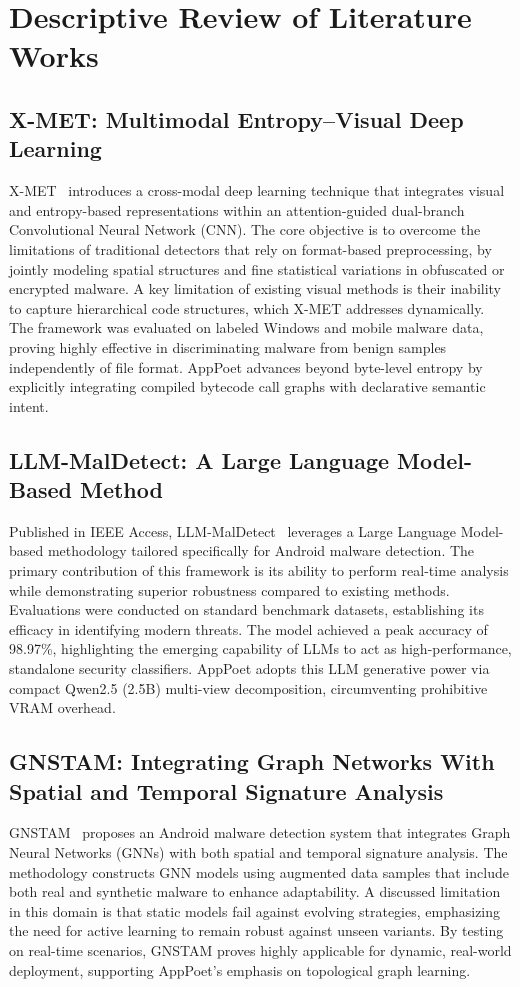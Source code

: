 \documentclass[12pt,a4paper,oneside]{report}
\begin{document}
\section{Descriptive Review of Literature Works}

\subsection{X-MET: Multimodal Entropy--Visual Deep Learning}
X-MET~\cite{ref16} introduces a cross-modal deep learning technique that integrates visual and entropy-based representations within an attention-guided dual-branch Convolutional Neural Network (CNN). The core objective is to overcome the limitations of traditional detectors that rely on format-based preprocessing, by jointly modeling spatial structures and fine statistical variations in obfuscated or encrypted malware. A key limitation of existing visual methods is their inability to capture hierarchical code structures, which X-MET addresses dynamically. The framework was evaluated on labeled Windows and mobile malware data, proving highly effective in discriminating malware from benign samples independently of file format. AppPoet advances beyond byte-level entropy by explicitly integrating compiled bytecode call graphs with declarative semantic intent.

\subsection{LLM-MalDetect: A Large Language Model-Based Method}
Published in IEEE Access, LLM-MalDetect~\cite{ref17} leverages a Large Language Model-based methodology tailored specifically for Android malware detection. The primary contribution of this framework is its ability to perform real-time analysis while demonstrating superior robustness compared to existing methods. Evaluations were conducted on standard benchmark datasets, establishing its efficacy in identifying modern threats. The model achieved a peak accuracy of 98.97\%, highlighting the emerging capability of LLMs to act as high-performance, standalone security classifiers. AppPoet adopts this LLM generative power via compact Qwen2.5 (2.5B) multi-view decomposition, circumventing prohibitive VRAM overhead.

\subsection{GNSTAM: Integrating Graph Networks With Spatial and Temporal Signature Analysis}
GNSTAM~\cite{ref18} proposes an Android malware detection system that integrates Graph Neural Networks (GNNs) with both spatial and temporal signature analysis. The methodology constructs GNN models using augmented data samples that include both real and synthetic malware to enhance adaptability. A discussed limitation in this domain is that static models fail against evolving strategies, emphasizing the need for active learning to remain robust against unseen variants. By testing on real-time scenarios, GNSTAM proves highly applicable for dynamic, real-world deployment, supporting AppPoet's emphasis on topological graph learning.
\end{document}
